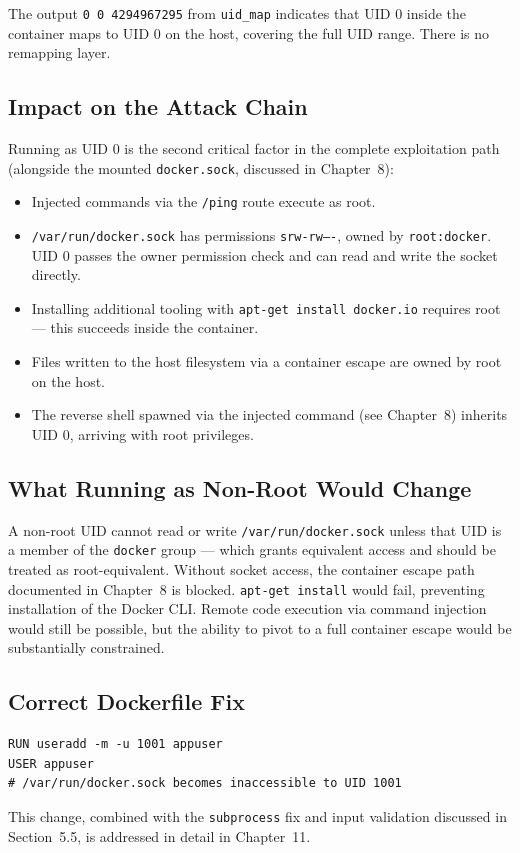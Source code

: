 The output \texttt{0 0 4294967295} from \texttt{uid\_map} indicates that UID 0 inside the container maps to UID 0 on the host, covering the full UID range. There is no remapping layer.

\subsection{Impact on the Attack Chain}

Running as UID 0 is the second critical factor in the complete exploitation path (alongside the mounted \texttt{docker.sock}, discussed in Chapter~8):

\begin{itemize}
    \item Injected commands via the \texttt{/ping} route execute as root.
    \item \texttt{/var/run/docker.sock} has permissions \texttt{srw-rw----}, owned by \texttt{root:docker}. UID 0 passes the owner permission check and can read and write the socket directly.
    \item Installing additional tooling with \texttt{apt-get install docker.io} requires root --- this succeeds inside the container.
    \item Files written to the host filesystem via a container escape are owned by root on the host.
    \item The reverse shell spawned via the injected command (see Chapter~8) inherits UID 0, arriving with root privileges.
\end{itemize}

\subsection{What Running as Non-Root Would Change}

A non-root UID cannot read or write \texttt{/var/run/docker.sock} unless that UID is a member of the \texttt{docker} group --- which grants equivalent access and should be treated as root-equivalent. Without socket access, the container escape path documented in Chapter~8 is blocked. \texttt{apt-get install} would fail, preventing installation of the Docker CLI. Remote code execution via command injection would still be possible, but the ability to pivot to a full container escape would be substantially constrained.

\subsection{Correct Dockerfile Fix}

\begin{lstlisting}
RUN useradd -m -u 1001 appuser
USER appuser
# /var/run/docker.sock becomes inaccessible to UID 1001
\end{lstlisting}

This change, combined with the \texttt{subprocess} fix and input validation discussed in Section~5.5, is addressed in detail in Chapter~11.